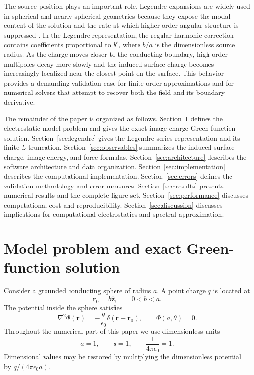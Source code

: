\documentclass[preprint,12pt]{elsarticle}
\begin{document}
The source position plays an important role. Legendre expansions are widely used in spherical and nearly spherical geometries because they expose the modal content of the solution and the rate at which higher-order angular structure is suppressed \cite{arfken2013,boyd1992}. In the Legendre representation, the regular harmonic correction contains coefficients proportional to $b^\ell$, where $b/a$ is the dimensionless source radius. As the charge moves closer to the conducting boundary, high-order multipoles decay more slowly and the induced surface charge becomes increasingly localized near the closest point on the surface. This behavior provides a demanding validation case for finite-order approximations and for numerical solvers that attempt to recover both the field and its boundary derivative.

The remainder of the paper is organized as follows. Section~\ref{sec:model} defines the electrostatic model problem and gives the exact image-charge Green-function solution. Section~\ref{sec:legendre} gives the Legendre-series representation and its finite-$L$ truncation. Section~\ref{sec:observables} summarizes the induced surface charge, image energy, and force formulas. Section~\ref{sec:architecture} describes the software architecture and data organization. Section~\ref{sec:implementation} describes the computational implementation. Section~\ref{sec:errors} defines the validation methodology and error measures. Section~\ref{sec:results} presents numerical results and the complete figure set. Section~\ref{sec:performance} discusses computational cost and reproducibility. Section~\ref{sec:discussion} discusses implications for computational electrostatics and spectral approximation.

\section{Model problem and exact Green-function solution}\label{sec:model}

Consider a grounded conducting sphere of radius $a$. A point charge $q$ is located at
\begin{equation}
    \mathbf r_0=b\hat{\mathbf z}, \qquad 0<b<a .
\end{equation}
The potential inside the sphere satisfies
\begin{equation}
    \nabla^2\Phi(\mathbf r)=-\frac{q}{\epsilon_0}\delta(\mathbf r-\mathbf r_0),
    \qquad \Phi(a,\theta)=0 .
    \label{eq:poisson}
\end{equation}
Throughout the numerical part of this paper we use dimensionless units
\begin{equation}
    a=1, \qquad q=1, \qquad \frac{1}{4\pi\epsilon_0}=1 .
\end{equation}
Dimensional values may be restored by multiplying the dimensionless potential by $q/(4\pi\epsilon_0 a)$.
\end{document}
